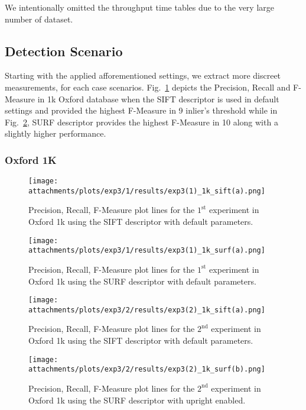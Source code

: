 	We intentionally omitted the throughput time tables due to the very large number of dataset.
	\newpage
	\subsection{Detection Scenario}\label{detection_scenario_ox} %
	Starting with the applied afforementioned settings, we extract more discreet measurements,
	for each case scenarios. Fig.~\ref{fig:oxf_exp1_sifta_1k} depicts the Precision, Recall and F-Measure
	in 1k Oxford database when the SIFT descriptor is used in default settings and provided the highest
	F-Measure in 9 inlier's threshold while in Fig.~\ref{fig:oxf_exp1_surfa_1k}, SURF descriptor provides the highest F-Measure in 10 along with a slightly higher performance.
	
	\subsubsection{Oxford 1K}\label{det_ox_1k}
	
		\begin{figure}[ht!]
		    \centering
		    \texttt{[image: attachments/plots/exp3/1/results/exp3(1)\_1k\_sift(a).png]}
		    \caption{Precision, Recall, F-Measure plot lines for the $1^\text{st}$  experiment in Oxford 1k using the SIFT descriptor with default parameters.}
		    \label{fig:oxf_exp1_sifta_1k}
		\end{figure}
		\newpage
		\begin{figure}[ht!]
		    \centering
		    \texttt{[image: attachments/plots/exp3/1/results/exp3(1)\_1k\_surf(a).png]}
		    \caption{Precision, Recall, F-Measure plot lines for the $1^\text{st}$  experiment in Oxford 1k using the SURF descriptor with default parameters.}
		    \label{fig:oxf_exp1_surfa_1k}
		\end{figure}		

		\begin{figure}[H]
		    \centering
		    \texttt{[image: attachments/plots/exp3/2/results/exp3(2)\_1k\_sift(a).png]}
		    \caption{Precision, Recall, F-Measure plot lines for the $2^\text{nd}$  experiment in Oxford 1k using the SIFT descriptor with default parameters.}
		    \label{fig:exp3_sift_a1k}
		\end{figure}
		\begin{figure}[ht!]
		    \centering
		    \texttt{[image: attachments/plots/exp3/2/results/exp3(2)\_1k\_surf(b).png]}
		    \caption{Precision, Recall, F-Measure plot lines for the $2^\text{nd}$ experiment in Oxford 1k using the SURF descriptor with upright enabled.}
		    \label{fig:exp3_surf_b1k}
		\end{figure}		

